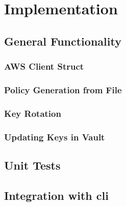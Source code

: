 \chapter{Implementation}
\section{General Functionality}
\subsection{AWS Client Struct}
\subsection{Policy Generation from File}
\subsection{Key Rotation}
\subsection{Updating Keys in Vault}

\section{Unit Tests}

\section{Integration with \ac{cli}}